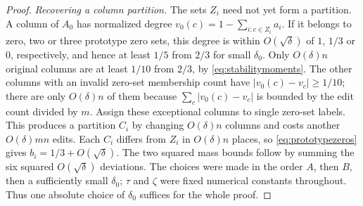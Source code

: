 \documentclass[11pt]{article}
\begin{document}
\begin{proof}
\smallskip\noindent\emph{Recovering a column partition.}
The sets $Z_i$ need not yet form a partition. A column of $A_0$ has normalized degree
$v_0(c)=1-\sum_{i:c\in Z_i}a_i$.
If it belongs to zero, two or three prototype zero sets, this degree is
within $O(\sqrt\delta)$ of $1$, $1/3$ or $0$, respectively, and hence
at least $1/5$ from $2/3$ for small $\delta_0$.
Only $O(\delta)n$ original columns are at
least $1/10$ from $2/3$, by \eqref{eq:stabilitymoments}.
The other columns with an invalid zero-set membership count have
$|v_0(c)-v_c|\ge1/10$; there are only $O(\delta)n$ of them because
$\sum_c|v_0(c)-v_c|$ is bounded by the edit count divided by $m$.
Assign these exceptional columns to single zero-set labels. This produces
a partition $C_i$ by changing $O(\delta)n$ columns and costs another
$O(\delta)mn$ edits. Each $C_i$ differs from $Z_i$ in $O(\delta)n$ places,
so \eqref{eq:prototypezeros} gives $b_i=1/3+O(\sqrt\delta)$.
The two squared mass bounds follow by summing the six squared
$O(\sqrt\delta)$ deviations. The choices were made in the order
$A$, then $B$, then a sufficiently small $\delta_0$; $\tau$ and $\zeta$
were fixed numerical constants throughout. Thus one absolute choice of
$\delta_0$ suffices for the whole proof.
\end{proof}
\end{document}
